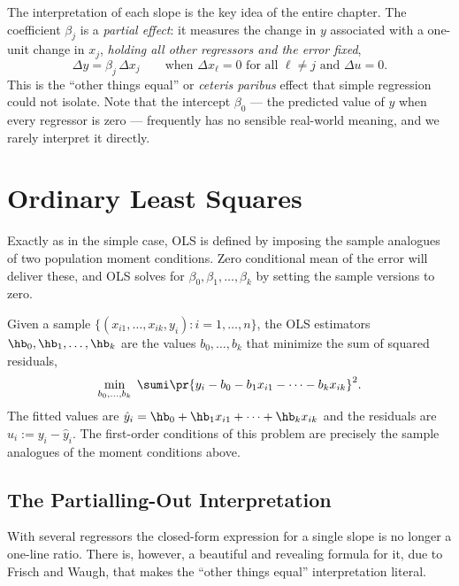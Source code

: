 The interpretation of each slope is the key idea of the entire chapter. The coefficient $\beta_j$ is a \emph{partial effect}: it measures the change in $y$ associated with a one-unit change in $x_j$, \emph{holding all other regressors and the error fixed},
\[
\Delta y = \beta_j\, \Delta x_j \qquad \text{when } \Delta x_\ell = 0 \text{ for all } \ell \ne j \text{ and } \Delta u = 0.
\]
This is the ``other things equal'' or \emph{ceteris paribus} effect that simple regression could not isolate. Note that the intercept $\beta_0$ --- the predicted value of $y$ when every regressor is zero --- frequently has no sensible real-world meaning, and we rarely interpret it directly.

\section{Ordinary Least Squares}

Exactly as in the simple case, OLS is defined by imposing the sample analogues of two population moment conditions. Zero conditional mean of the error will deliver these, and OLS solves for $\beta_0,\beta_1,\dots,\beta_k$ by setting the sample versions to zero.


Given a sample $\{(x_{i1},\dots,x_{ik},y_i):i=1,\dots,n\}$, the OLS estimators $\hb_0,\hb_1,\dots,\hb_k$ are the values $b_0,\dots,b_k$ that minimize the sum of squared residuals,
\[
\min_{b_0,\dots,b_k} \; \sumi \pr{y_i - b_0 - b_1 x_{i1} - \cdots - b_k x_{ik}}^2.
\]
The fitted values are $\hat y_i = \hb_0 + \hb_1 x_{i1} + \cdots + \hb_k x_{ik}$ and the residuals are $\hat u_i := y_i - \hat y_i$. The first-order conditions of this problem are precisely the sample analogues of the moment conditions above.

\subsection{The Partialling-Out Interpretation}

With several regressors the closed-form expression for a single slope is no longer a one-line ratio. There is, however, a beautiful and revealing formula for it, due to Frisch and Waugh, that makes the ``other things equal'' interpretation literal.

